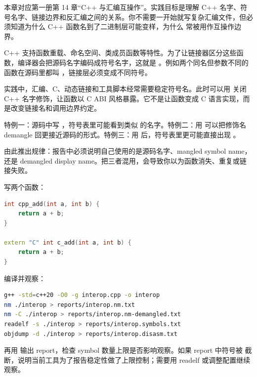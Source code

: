 
本章对应第一册第 14 章“C++ 与汇编互操作”。实践目标是理解 C++ 名字、符号名字、链接边界和反汇编之间的关系。你不需要一开始就写复杂汇编文件，但必须知道为什么 C++ 函数名到了二进制层可能变样，为什么  常被用作互操作边界。


C++ 支持函数重载、命名空间、类成员函数等特性。为了让链接器区分这些函数，编译器会把源码名字编码成符号名字，这就是 。例如两个同名但参数不同的函数在源码里都叫 ，链接层必须变成不同符号。

实践中，汇编、C、动态链接和工具脚本经常需要稳定符号名。此时可以用  关闭 C++ 名字修饰，让函数以 C ABI 风格暴露。它不是让函数变成 C 语言实现，而是改变链接名和调用边界约定。


特例一：源码中写 ，符号表里可能看到类似  的名字。特例二：用  可以把修饰名 demangle 回更接近源码的形式。特例三：用  后，符号表里更可能直接出现 。

由此推出规律：报告中必须说明自己使用的是源码名字、mangled symbol name，还是 demangled display name。把三者混用，会导致你以为函数消失、重复或链接失败。


写两个函数：

\begin{lstlisting}[language=C++]
int cpp_add(int a, int b) {
    return a + b;
}

extern "C" int c_add(int a, int b) {
    return a + b;
}
\end{lstlisting}

编译并观察：

\begin{lstlisting}[language=bash]
g++ -std=c++20 -O0 -g interop.cpp -o interop
nm ./interop > reports/interop.nm.txt
nm -C ./interop > reports/interop.nm-demangled.txt
readelf -s ./interop > reports/interop.symbols.txt
objdump -d ./interop > reports/interop.disasm.txt
\end{lstlisting}

再用  输出 report，检查 symbol 数量上限是否影响观察。如果 report 中符号被  截断，说明当前工具为了报告稳定性做了上限控制；需要用 readelf 或调整配置继续观察。

